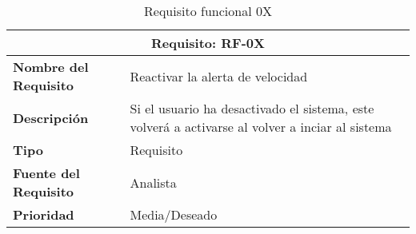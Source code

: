 \documentclass[10pt,a4paper,oldfontcommands]{dpds}
\begin{document}
\begin{table}[h]
\begin{center}
\begin{tabular}{p{} p{7cm}}
\multicolumn{2}{c}{\textbf{Requisito: RF-0X} } \\
\hline \hline
\textbf{Nombre del Requisito} & Reactivar la alerta de velocidad \\
\textbf{Descripción} & Si el usuario ha desactivado el sistema, este volverá a activarse al volver a inciar al sistema \\
\textbf{Tipo} & Requisito  \\
\textbf{Fuente del Requisito} & Analista  \\
\textbf{Prioridad} & Media/Deseado  \\ \hline
\end{tabular}
\caption{Requisito funcional 0X}
\label{tab:personal}
\end{center}
\end{table}
\end{document}
